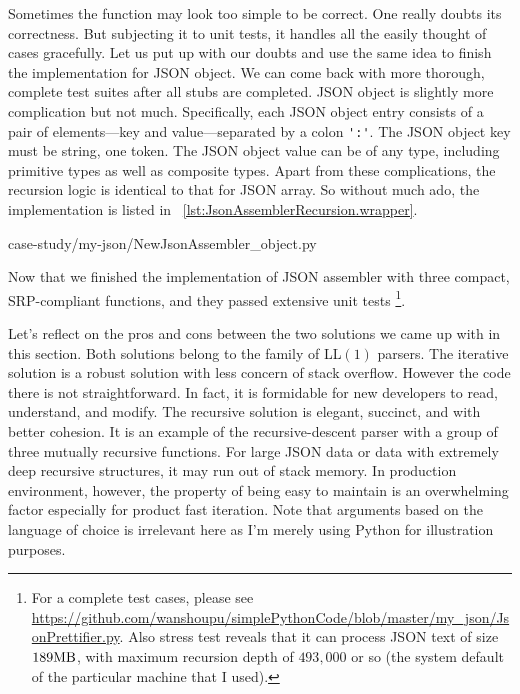 \documentclass[oneside,11pt]{book}
\theoremstyle{definition}
\theoremstyle{remark}
\newcommand{\code}[1]{\mbox{\lstinline{#1}}}
\newcommand{\python}{Python }
\begin{document}
Sometimes the function may look too simple to be correct.
One really doubts its correctness.
But subjecting it to unit tests, it handles all the easily thought of cases gracefully.
Let us put up with our doubts and use the same idea
to finish the implementation for JSON object.
We can come back with more thorough, complete test suites after all stubs are completed.
JSON object is slightly more complication but not much.
Specifically, each JSON object entry consists of a pair of elements---key and value---separated
by a colon \code{':'}.
The JSON object key must be string, one token.
The JSON object value can be of any type, including primitive types as well as composite types.
Apart from these complications, the recursion logic is identical to that for JSON array.
So without much ado, the implementation is listed in ~\autoref{lst:JsonAssemblerRecursion.wrapper}.

\begin{table}[H]

{case-study/my-json/NewJsonAssembler_object.py}
\end{table}

Now that we finished the implementation of JSON assembler with three compact,
SRP-compliant functions, and they passed extensive unit tests \footnote{For a complete test
cases, please see
\url{https://github.com/wanshoupu/simplePythonCode/blob/master/my_json/JsonPrettifier.py}.
Also stress test reveals that it can process JSON text of size $189\mbox{\code{MB}}$, with maximum
recursion depth of $493,000$ or so (the system default of the particular machine that I used).}.

Let's reflect on the pros and cons between the two solutions we came up with in this section.
Both solutions belong to the family of LL$(1)$ parsers\cite{Rosenkrantz:1969:LL-parser}.
The iterative solution is a robust solution with less concern of stack overflow.
However the code there is not straightforward.
In fact, it is formidable for new developers to read, understand, and modify.
The recursive solution is elegant, succinct, and with better cohesion.
It is an example of the recursive-descent parser with a group
of three mutually recursive functions.
For large JSON data or data with extremely deep recursive structures, it may run out of stack
memory.
In production environment, however, the property of being easy to maintain is an overwhelming
factor especially for product fast iteration.
Note that arguments based on the language of choice is irrelevant here as I'm merely using
\python for illustration purposes.
\end{document}

